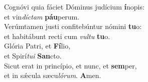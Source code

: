 \oddverse Cognóvi quia fáciet Dóminus judícium \textbf{í}nopis:~\*\\
\oddverse et vin\textit{dí}\textit{ctam} \textbf{páu}perum.\\
\evenverse Verúmtamen justi confitebúntur nómini \textbf{tu}o:~\*\\
\evenverse et habitábunt recti cum \textit{vul}\textit{tu} \textbf{tu}o.\\
\oddverse Glória Patri, et \textbf{Fí}lio,~\*\\
\oddverse et Spirí\textit{tu}\textit{i} \textbf{San}cto.\\
\evenverse Sicut erat in princípio, et nunc, et \textbf{sem}per,~\*\\
\evenverse et in sǽcula sæcu\textit{ló}\textit{rum}. \textbf{A}men.\\
